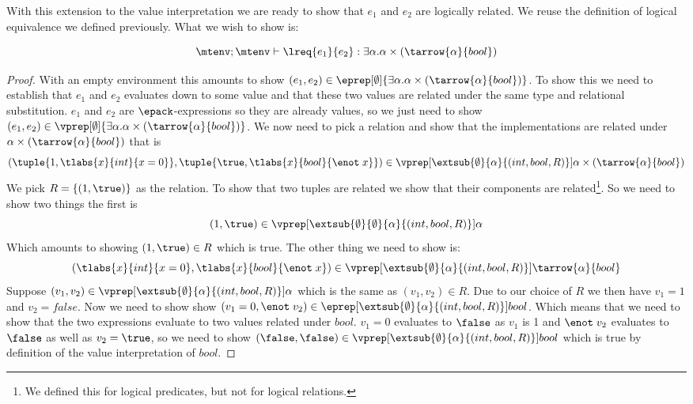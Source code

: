 With this extension to the value interpretation we are ready to show that $e_1$ and $e_2$ are logically related. We reuse the definition of logical equivalence we defined previously. What we wish to show is:

\begin{theorem}
\[
  \mtenv; \mtenv \vdash \lreq{e_1}{e_2} : \exists \alpha. \alpha \times (\tarrow{\alpha}{bool})
\]
\end{theorem}
\begin{proof}
  With an empty environment this amounts to show $(e_1,e_2) \in \eprep[\emptyset]{\exists \alpha. \alpha \times (\tarrow{\alpha}{bool})}$. To show this we need to establish that $e_1$ and $e_2$ evaluates down to some value and that these two values are related under the same type and relational substitution. $e_1$ and $e_2$ are $\epack$-expressions so they are already values, so we just need to show $(e_1,e_2) \in \vprep[\emptyset]{\exists \alpha. \alpha \times (\tarrow{\alpha}{bool})}$. We now need to pick a relation and show that the implementations are related under $\alpha \times (\tarrow{\alpha}{bool})$ that is
  \[
  (\tuple{1, \tlabs{x}{int}{x=0}},\tuple{\true, \tlabs{x}{bool}{\enot\; x}}) \in \vprep[\extsub{\emptyset}{\alpha}{(int,bool,R)}]{\alpha \times (\tarrow{\alpha}{bool})}
  \]
  We pick $R=\{(1,\true)\}$ as the relation. To show that two tuples are related we show that their components are related\footnote{We defined this for logical predicates, but not for logical relations.}. So we need to show two things the first is
  \[
  (1,\true) \in \vprep[\extsub{\emptyset}{\emptyset}{\alpha}{(int,bool,R)}]{\alpha}
  \]
  Which amounts to showing $(1,\true) \in R$ which is true. The other thing we need to show is:
  \[
  (\tlabs{x}{int}{x=0},\tlabs{x}{bool}{\enot\; x}) \in \vprep[\extsub{\emptyset}{\alpha}{(int,bool,R)}]{\tarrow{\alpha}{bool}}
  \]
  Suppose $(v_1,v_2) \in \vprep[\extsub{\emptyset}{\alpha}{(int,bool,R)}]{\alpha}$
  which is the same as $(v_1,v_2) \in R$. Due to our choice of $R$ we then have $v_1 = 1$ and $v_2 = false$.
  Now we need to show show $(v_1 = 0,\enot\; v_2) \in \eprep[\extsub{\emptyset}{\alpha}{(int,bool,R)}]{bool}$. Which means that we need to show that the two expressions evaluate to two values related under $bool$. $v_1 = 0$ evaluates to $\false$ as $v_1$ is 1 and $\enot\; v_2$ evaluates to $\false$ as well as $v_2 = \true$, so we need to show $(\false,\false) \in \vprep[\extsub{\emptyset}{\alpha}{(int,bool,R)}]{bool}$ which is true by definition of the value interpretation of $bool$.
\end{proof}
\clearpage
